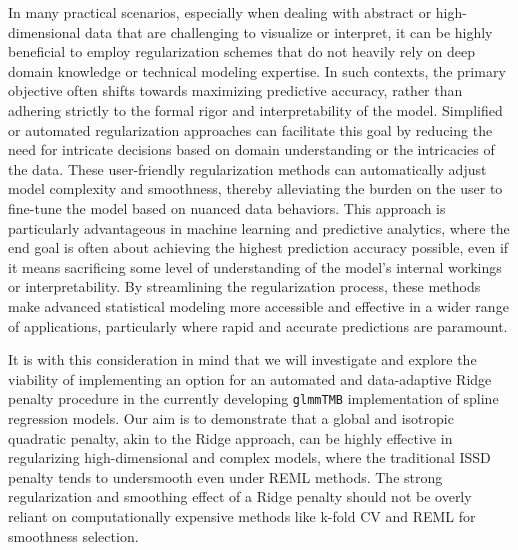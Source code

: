 \documentclass[12pt, twoside,hidelinks]{article}
\theoremstyle{definition}
\numberwithin{equation}{section}
\begin{document}
In many practical scenarios, especially when dealing with abstract or high-dimensional data that are challenging to visualize or interpret, it can be highly beneficial to employ regularization schemes that do not heavily rely on deep domain knowledge or technical modeling expertise. In such contexts, the primary objective often shifts towards maximizing predictive accuracy, rather than adhering strictly to the formal rigor and interpretability of the model. Simplified or automated regularization approaches can facilitate this goal by reducing the need for intricate decisions based on domain understanding or the intricacies of the data. These user-friendly regularization methods can automatically adjust model complexity and smoothness, thereby alleviating the burden on the user to fine-tune the model based on nuanced data behaviors. This approach is particularly advantageous in machine learning and predictive analytics, where the end goal is often about achieving the highest prediction accuracy possible, even if it means sacrificing some level of understanding of the model's internal workings or interpretability. By streamlining the regularization process, these methods make advanced statistical modeling more accessible and effective in a wider range of applications, particularly where rapid and accurate predictions are paramount.
\newline

It is with this consideration in mind that we will investigate and explore the viability of implementing an option for an automated and data-adaptive Ridge penalty procedure in the currently developing \texttt{glmmTMB} implementation of spline regression models. Our aim is to demonstrate that a global and isotropic quadratic penalty, akin to the Ridge approach, can be highly effective in regularizing high-dimensional and complex models, where the traditional ISSD penalty tends to undersmooth even under REML methods. The strong regularization and smoothing effect of a Ridge penalty should not be overly reliant on computationally expensive methods like k-fold CV and REML for smoothness selection. 
\end{document}
